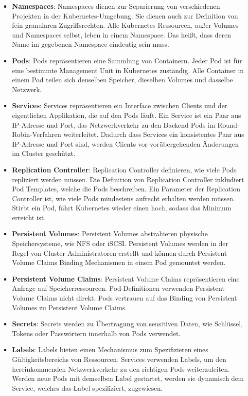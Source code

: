 \begin{itemize}
	\item \textbf{Namespaces}: Namespaces dienen zur Separierung von verschiedenen Projekten in der Kubernetes-Umgebung. Sie dienen auch zur Definition von fein granularen Zugriffsrechten. Alle Kubernetes Ressourcen, außer Volumes und Namespaces selbst, leben in einem Namespace. Das heißt, dass deren Name im gegebenen Namespace eindeutig sein muss.
	\item \textbf{Pods}: Pods repräsentieren eine Sammlung von Containern. Jeder Pod ist für eine bestimmte Management Unit in Kubernetes zuständig. Alle Container in einem Pod teilen sich denselben Speicher, dieselben Volumes und dasselbe Netzwerk.
	\item \textbf{Services}: Services repräsentieren ein Interface zwischen Clients und der eigentlichen Applikation, die auf den Pods läuft. Ein Service ist ein Paar aus IP-Adresse und Port, das Netzwerkverkehr zu den Backend Pods im Round-Robin-Verfahren weiterleitet. Dadurch dass Services ein konsistentes Paar aus IP-Adresse und Port sind, werden Clients vor vorübergehenden Änderungen im Cluster geschützt.
	\item \textbf{Replication Controller}: Replication Controller definieren, wie viele Pods repliziert werden müssen. Die Definition von Replication Controller inkludiert Pod Templates, welche die Pods beschreiben. Ein Parameter der Replication Controller ist, wie viele Pods mindestens aufrecht erhalten werden müssen. Stirbt ein Pod, fährt Kubernetes wieder einen hoch, sodass das Minimum erreicht ist.
	\item \textbf{Persistent Volumes}: Persistent Volumes abstrahieren physische Speichersysteme, wie NFS oder iSCSI. Persistent Volumes werden in der Regel von Cluster-Administratoren erstellt und können durch Persistent Volume Claims Binding Mechanismen in einem Pod gemountet werden.
	\item \textbf{Persistent Volume Claims}: Persistent Volume Claims repräsentieren eine Anfrage auf Speicherressourcen. Pod-Definitionen verwenden Persistent Volume Claims nicht direkt. Pods vertrauen auf das Binding von Persistent Volumes zu Persistent Volume Claims.
	\item \textbf{Secrets}: Secrets werden zu Übertragung von sensitiven Daten, wie Schlüssel, Tokens oder Passwörtern innerhalb von Pods verwendet.
	\item \textbf{Labels}: Labels bieten einen Mechanismus zum Spezifizieren eines Gültigkeitsbereichs von Ressourcen. Services verwenden Labels, um den hereinkommenden Netzwerkverkehr zu den richtigen Pods weiterzuleiten. Werden neue Pods mit demselben Label gestartet, werden sie dynamisch dem Service, welches das Label spezifiziert, zugewiesen.
\end{itemize}

